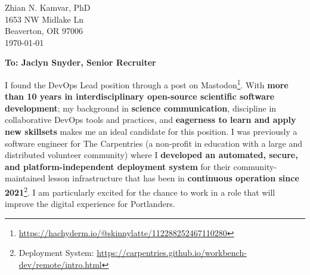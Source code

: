


\clearpage
\begin{flushright}
  Zhian N. Kamvar, PhD\\
  1653 NW Midlake Ln\\
  Beaverton, OR 97006\\
  \today
\end{flushright}

\textbf{To: Jaclyn Snyder, Senior Recruiter}\\

\vspace{2ex}


I found the DevOps Lead position through a post on Mastodon\footnote{\url{https://hachyderm.io/@skinnylatte/112288252467110280}}. 
With \textbf{more than 10 years in interdisciplinary open-source scientific software development}; my background in \textbf{science communication}, discipline in collaborative DevOps tools and practices, and \textbf{eagerness to learn and apply new skillsets} makes me an ideal candidate for this position. 
I was previously a software engineer for The Carpentries (a non-profit in education with a large and distributed volunteer community) where I \textbf{developed an automated, secure, and platform-independent deployment system} for their community-maintained lesson infrastructure that has been in \textbf{continuous operation since 2021}\footnote{Deployment System: \url{https://carpentries.github.io/workbench-dev/remote/intro.html}}.
I am particularly excited for the chance to work in a role that will improve the digital experience for Portlanders.



